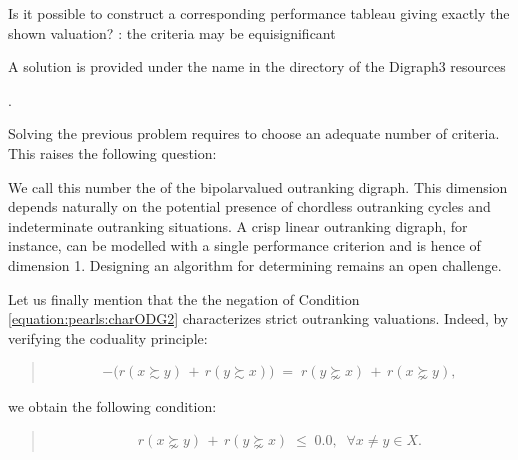 \documentclass[a4paper,12pt,english]{sphinxhowto}
\begin{document}
\sphinxAtStartPar
Is it possible to construct a corresponding performance tableau giving exactly the shown valuation? : the criteria may be equi\sphinxhyphen{}significant %
\begin{footnote}[7]\sphinxAtStartFootnote
A solution is provided under the name  in the  directory of the Digraph3 resources
%
\end{footnote}.

\sphinxAtStartPar
Solving the previous problem requires to choose an adequate number of criteria. This raises the following question:
\begin{quote}

\sphinxAtStartPar
{}
\end{quote}

\sphinxAtStartPar
We call this number the  of the bipolar\sphinxhyphen{}valued outranking digraph. This dimension depends naturally on the potential presence of chordless outranking cycles and indeterminate outranking situations. A crisp linear outranking digraph, for instance, can be modelled with a single performance criterion and is hence of dimension 1. Designing an algorithm for determining  remains an open challenge.

\sphinxAtStartPar
Let us finally mention that the  \textendash{}the negation\textendash{} of Condition \eqref{equation:pearls:charODG2} characterizes strict outranking valuations. Indeed, by verifying the coduality principle:
\begin{quote}
\begin{equation*}
\begin{split}-\big(r(x \succsim y)\,+\,r(y \succsim x)\big) \; = \; r(y \succnsim x)\,+\,r(x \succnsim y),\end{split}
\end{equation*}\end{quote}

\sphinxAtStartPar
we obtain the following condition:
\begin{quote}
\begin{equation}\label{equation:pearls:strictODG}
\begin{split}r(x \succnsim y)\,+\,r(y \succnsim x) \; \leqslant \; 0.0, \;\; \forall x \neq y \in X.\end{split}
\end{equation}\end{quote}
\end{document}
